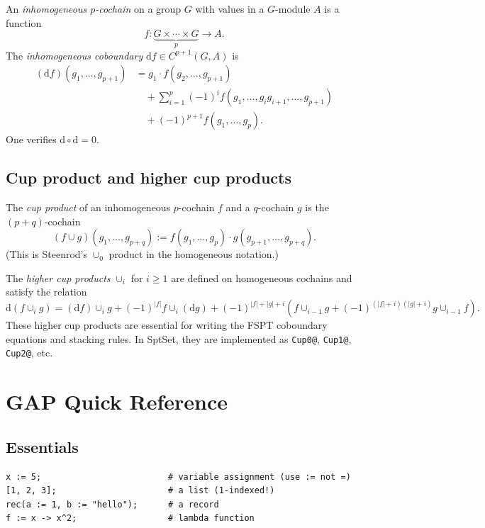 \documentclass{SciPost}
\theoremstyle{definition}
\newcommand{\dd}{\mathrm{d}}
\begin{document}
An \emph{inhomogeneous $p$-cochain} on a group $G$ with values in a $G$-module $A$ is a function
\begin{equation}
f: \underbrace{G \times \cdots \times G}_{p} \longrightarrow A.
\end{equation}
The \emph{inhomogeneous coboundary} $\dd f \in C^{p+1}(G, A)$ is
\begin{align}
(\dd f)(g_1, \ldots, g_{p+1}) &= g_1 \cdot f(g_2, \ldots, g_{p+1}) \nonumber \\
&\quad + \sum_{i=1}^{p} (-1)^i f(g_1, \ldots, g_i g_{i+1}, \ldots, g_{p+1}) \nonumber \\
&\quad + (-1)^{p+1} f(g_1, \ldots, g_p). \label{eq:inhomo-coboundary}
\end{align}
One verifies $\dd \circ \dd = 0$.

\subsection{Cup product and higher cup products}

The \emph{cup product} of an inhomogeneous $p$-cochain $f$ and a $q$-cochain $g$ is the $(p+q)$-cochain
\begin{equation}
(f \cup g)(g_1, \ldots, g_{p+q}) := f(g_1, \ldots, g_p) \cdot g(g_{p+1}, \ldots, g_{p+q}).
\end{equation}
(This is Steenrod's $\cup_0$ product in the homogeneous notation.)

The \emph{higher cup products} $\cup_i$ for $i \geq 1$ are defined on homogeneous cochains and satisfy the relation
\begin{equation}
\dd(f \cup_i g) = (\dd f) \cup_i g + (-1)^{|f|} f \cup_i (\dd g) + (-1)^{|f|+|g|+i} (f \cup_{i-1} g + (-1)^{(|f|+i)(|g|+i)} g \cup_{i-1} f).
\end{equation}
These higher cup products are essential for writing the FSPT coboundary equations and stacking rules.
In SptSet, they are implemented as \texttt{Cup0@}, \texttt{Cup1@}, \texttt{Cup2@}, etc.


\section{GAP Quick Reference}
\label{ap:gap-quick}

\subsection{Essentials}
\begin{verbatim}
x := 5;                         # variable assignment (use := not =)
[1, 2, 3];                      # a list (1-indexed!)
rec(a := 1, b := "hello");      # a record
f := x -> x^2;                  # lambda function
\end{verbatim}
\end{document}
